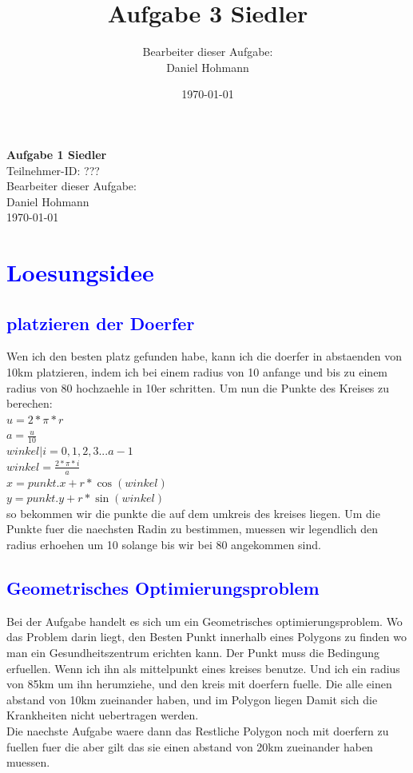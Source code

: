 \documentclass{article}
\title{\Huge{\textbf{Aufgabe 3 Siedler}} \\ \centering{\LARGE{Teilnahme-ID: ?????}}}
\author{Bearbeiter dieser Aufgabe: \\ Daniel Hohmann}
\date{\today}
\begin{document}
\thispagestyle{empty}
\begin{center}
\Huge{\textbf{Aufgabe 1 Siedler}}
\\
\LARGE{Teilnehmer-ID: ???}
\\
\LARGE{Bearbeiter dieser Aufgabe: \\ Daniel Hohmann}
\\
\LARGE{\today}
\end{center}
\newpage
\setcounter{page}{1}
\tableofcontents
\newpage
\section{\textcolor{blue}{Loesungsidee}}
\subsection{\textcolor{blue}{platzieren der Doerfer}}
Wen ich den besten platz gefunden habe, kann ich die doerfer in abstaenden von 10km platzieren, indem ich bei einem radius von 10 anfange und bis zu einem radius von 80 hochzaehle in 10er schritten. Um nun die Punkte des Kreises zu berechen:
\\
$u = 2 * \pi * r$
\\
$a = \frac{u}{10}$
\\
$winkel |i = 0,1,2,3...a-1$
\\
$winkel = \frac{2 * \pi * i}{a}$
\\
$x = punkt.x + r * \cos(winkel)$
\\
$y = punkt.y + r * \sin(winkel)$
\\
so bekommen wir die punkte die auf dem umkreis des kreises liegen. Um die Punkte fuer die naechsten Radin zu bestimmen, muessen wir legendlich den radius erhoehen um 10 solange bis wir bei 80 angekommen sind.
\subsection{\textcolor{blue}{Geometrisches Optimierungsproblem}}
Bei der Aufgabe handelt es sich um ein Geometrisches optimierungsproblem. Wo das Problem darin liegt, den Besten Punkt innerhalb eines Polygons zu finden wo man ein Gesundheitszentrum erichten kann. Der Punkt muss die Bedingung erfuellen. Wenn ich ihn als mittelpunkt eines kreises benutze. Und ich ein radius von 85km um ihn herumziehe, und den kreis mit doerfern fuelle. Die alle einen abstand von 10km zueinander haben, und im Polygon liegen Damit sich die Krankheiten nicht uebertragen werden.
\\
Die naechste Aufgabe waere dann das Restliche Polygon noch mit doerfern zu fuellen fuer die aber gilt das sie einen abstand von 20km zueinander haben muessen.
\end{document}
